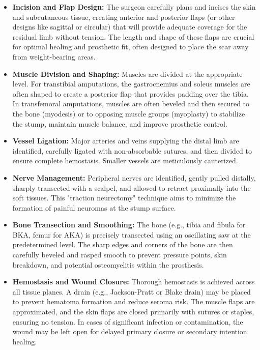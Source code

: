 \begin{itemize}
  \item \textbf{Incision and Flap Design:} The surgeon carefully plans and incises the skin and subcutaneous tissue, creating anterior and posterior flaps (or other designs like sagittal or circular) that will provide adequate coverage for the residual limb without tension. The length and shape of these flaps are crucial for optimal healing and prosthetic fit, often designed to place the scar away from weight-bearing areas.
  \item \textbf{Muscle Division and Shaping:} Muscles are divided at the appropriate level. For transtibial amputations, the gastrocnemius and soleus muscles are often shaped to create a posterior flap that provides padding over the tibia. In transfemoral amputations, muscles are often beveled and then secured to the bone (myodesis) or to opposing muscle groups (myoplasty) to stabilize the stump, maintain muscle balance, and improve prosthetic control.
  \item \textbf{Vessel Ligation:} Major arteries and veins supplying the distal limb are identified, carefully ligated with non-absorbable sutures, and then divided to ensure complete hemostasis. Smaller vessels are meticulously cauterized.
  \item \textbf{Nerve Management:} Peripheral nerves are identified, gently pulled distally, sharply transected with a scalpel, and allowed to retract proximally into the soft tissues. This "traction neurectomy" technique aims to minimize the formation of painful neuromas at the stump surface.
  \item \textbf{Bone Transection and Smoothing:} The bone (e.g., tibia and fibula for BKA, femur for AKA) is precisely transected using an oscillating saw at the predetermined level. The sharp edges and corners of the bone are then carefully beveled and rasped smooth to prevent pressure points, skin breakdown, and potential osteomyelitis within the prosthesis.
  \item \textbf{Hemostasis and Wound Closure:} Thorough hemostasis is achieved across all tissue planes. A drain (e.g., Jackson-Pratt or Blake drain) may be placed to prevent hematoma formation and reduce seroma risk. The muscle flaps are approximated, and the skin flaps are closed primarily with sutures or staples, ensuring no tension. In cases of significant infection or contamination, the wound may be left open for delayed primary closure or secondary intention healing.
\end{itemize}

